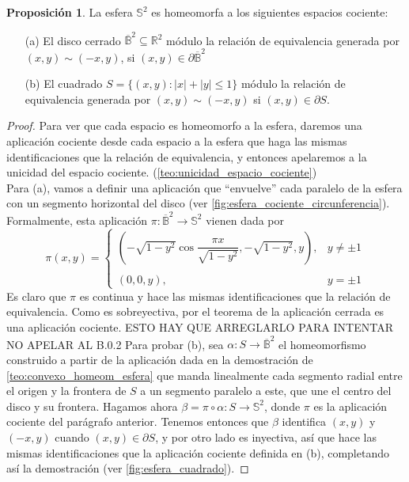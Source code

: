 \documentclass[10pt]{report}
\theoremstyle{definition}
\newtheorem{prop}[defin]{Proposición}
\begin{document}
\begin{prop}%
\label{prop:Esfera como cociente de disco y cuadrado}
La esfera $\mathbb{S}^2$ es homeomorfa a los siguientes espacios cociente: 
\begin{itemize}
\item[(a)] El disco cerrado $\overline{\mathbb{B}}^2\subseteq \mathbb{R}^2$ módulo la relación de equivalencia generada por $(x,y)\sim (-x,y)$, si $(x,y)\in \partial \overline{\mathbb{B}}^2$
\item[(b)] El cuadrado $S=\{(x,y):|x|+|y|\leq 1\}$ módulo la relación de equivalencia generada por $(x,y)\sim(-x,y)$ si $(x,y)\in \partial S$.
\end{itemize}
\end{prop}
\begin{proof}
Para ver que cada espacio es homeomorfo a la esfera, daremos una aplicación cociente desde cada espacio a la esfera que haga las mismas identificaciones que la relación de equivalencia, y entonces apelaremos a la unicidad del espacio cociente. (\autoref{teo:unicidad_espacio_cociente})\\
Para (a), vamos a definir una aplicación que ``envuelve'' cada paralelo de la esfera con un segmento horizontal del disco (ver \autoref{fig:esfera_cociente_circunferencia}).
Formalmente, esta aplicación $\pi:\overline{\mathbb{B}}^2\to \mathbb{S}^2$ vienen dada por 
$$\pi(x,y)=\left\{\begin{array}{lc}
			(-\sqrt{1-y^2} \cos\dfrac{\pi x}{\sqrt{1-y^2}}, -\sqrt{1-y^2}, y), & y\neq \pm 1 \\
			\\(0,0,y), & y=\pm1 

\end{array}
\right.$$
Es claro que $\pi$ es continua y hace las mismas identificaciones que la relación de equivalencia. Como es sobreyectiva, por el teorema de la aplicación cerrada es una aplicación cociente. %
ESTO HAY QUE ARREGLARLO PARA INTENTAR NO APELAR AL B.0.2
Para probar (b), sea $\alpha:S\to \overline{\mathbb{B}}^2$ el homeomorfismo construido a partir de la aplicación dada en la demostración de \autoref{teo:convexo_homeom_esfera} que manda linealmente cada segmento radial entre el origen y la frontera de $S$ a un segmento paralelo a este, que une el centro del disco y su frontera. Hagamos ahora $\beta=\pi \circ \alpha : S \to \mathbb{S}^2$, donde $\pi$ es la aplicación cociente del parágrafo anterior. Tenemos entonces que $\beta$ identifica $(x,y)$ y $(-x,y)$ cuando $(x,y)\in \partial S$, y por otro lado es inyectiva, así que hace las mismas identificaciones que la aplicación cociente definida en (b), completando así la demostración (ver \autoref{fig:esfera_cuadrado}). 
\end{proof}
\end{document}
